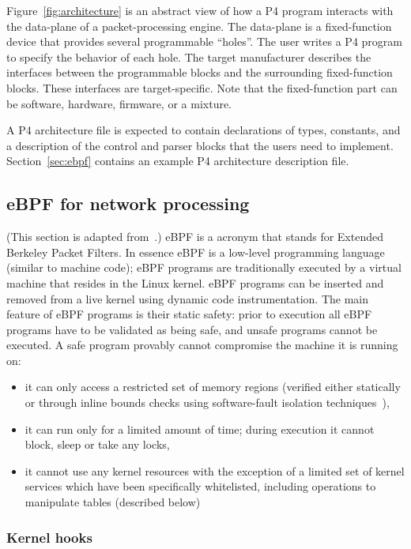 Figure~\ref{fig:architecture} is an abstract view of how a P4 program
interacts with the data-plane of a packet-processing engine.  The
data-plane is a fixed-function device that provides several
programmable ``holes''.  The user writes a P4 program to specify the
behavior of each hole.  The target manufacturer describes the
interfaces between the programmable blocks and the surrounding
fixed-function blocks.  These interfaces are target-specific.  Note
that the fixed-function part can be software, hardware, firmware, or a
mixture.

A P4 architecture file is expected to contain declarations of types,
constants, and a description of the control and parser blocks that the
users need to implement.  Section~\ref{sec:ebpf} contains an example
P4 architecture description file.

\subsection{eBPF for network processing}

(This section is adapted from~\cite{p4-ebpf-backend}.)  eBPF is a
acronym that stands for Extended Berkeley Packet Filters. In essence
eBPF is a low-level programming language (similar to machine code);
eBPF programs are traditionally executed by a virtual machine that
resides in the Linux kernel. eBPF programs can be inserted and removed
from a live kernel using dynamic code instrumentation. The main
feature of eBPF programs is their static safety: prior to execution
all eBPF programs have to be validated as being safe, and unsafe
programs cannot be executed. A safe program provably cannot compromise
the machine it is running on:
\begin{itemize}
\item it can only access a restricted set of memory regions (verified
  either statically or through inline bounds checks using
  software-fault isolation techniques~\cite{wahbe:93}),
\item it can run only for a limited amount of time; during execution
  it cannot block, sleep or take any locks,
\item it cannot use any kernel resources with the exception of a
  limited set of kernel services which have been specifically
  whitelisted, including operations to manipulate tables (described
  below)
\end{itemize}

\subsubsection{Kernel hooks}

